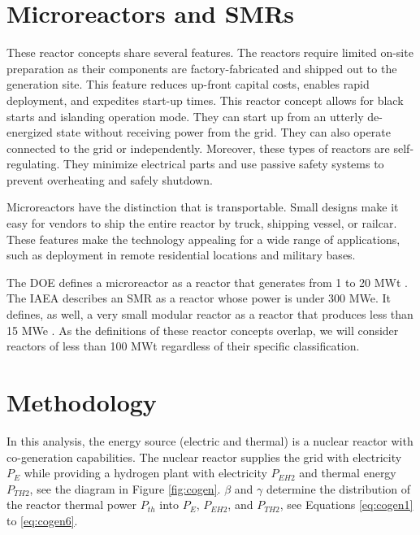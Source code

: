 \section{Microreactors and \glspl{SMR}}
\label{sec:reactors}

These reactor concepts share several features.
The reactors require limited on-site preparation as their components are factory-fabricated and shipped out to the generation site.
This feature reduces up-front capital costs, enables rapid deployment, and expedites start-up times.
This reactor concept allows for black starts and islanding operation mode.
They can start up from an utterly de-energized state without receiving power from the grid.
They can also operate connected to the grid or independently.
Moreover, these types of reactors are self-regulating.
They minimize electrical parts and use passive safety systems to prevent overheating and safely shutdown.

Microreactors have the distinction that is transportable.
Small designs make it easy for vendors to ship the entire reactor by truck, shipping vessel, or railcar.
These features make the technology appealing for a wide range of applications, such as deployment in remote residential locations and military bases.

The \gls{DOE} defines a microreactor as a reactor that generates from 1 to 20 MWt \cite{us-doe_ultimate_2019}.
The \gls{IAEA} describes an \gls{SMR} as a reactor whose power is under 300 MWe.
It defines, as well, a very small modular reactor as a reactor that produces less than 15 MWe \cite{world_nuclear_association_small_2020}.
As the definitions of these reactor concepts overlap, we will consider reactors of less than 100 MWt regardless of their specific classification.

\section{Methodology}
\label{sec:metho}

In this analysis, the energy source (electric and thermal) is a nuclear reactor with co-generation capabilities.
The nuclear reactor supplies the grid with electricity $P_E$ while providing a hydrogen plant with electricity $P_{EH2}$ and thermal energy $P_{TH2}$, see the diagram in Figure \ref{fig:cogen}.
$\beta$ and $\gamma$ determine the distribution of the reactor thermal power $P_{th}$ into $P_E$, $P_{EH2}$, and $P_{TH2}$, see Equations \ref{eq:cogen1} to \ref{eq:cogen6}.

